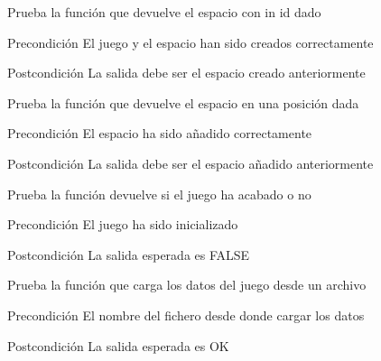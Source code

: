\begin{DoxyRefList}
\item[\label{test__test000086}%
\hypertarget{test__test000086}{}%
Global \hyperlink{game__test_8c_acc05e3dc9b82dbd4566c26a039646df9}{test1\-\_\-game\-\_\-get\-\_\-space} ()]Prueba la función que devuelve el espacio con in id dado \begin{DoxyPrecond}{Precondición}
El juego y el espacio han sido creados correctamente 
\end{DoxyPrecond}
\begin{DoxyPostcond}{Postcondición}
La salida debe ser el espacio creado anteriormente  
\end{DoxyPostcond}

\item[\label{test__test000089}%
\hypertarget{test__test000089}{}%
Global \hyperlink{game__test_8c_a98eac6fd35561009ca78b17022316cef}{test1\-\_\-game\-\_\-get\-\_\-space\-\_\-at} ()]Prueba la función que devuelve el espacio en una posición dada \begin{DoxyPrecond}{Precondición}
El espacio ha sido añadido correctamente 
\end{DoxyPrecond}
\begin{DoxyPostcond}{Postcondición}
La salida debe ser el espacio añadido anteriormente  
\end{DoxyPostcond}

\item[\label{test__test000066}%
\hypertarget{test__test000066}{}%
Global \hyperlink{game__test_8c_a6ab3378c3e627b8ff5cb397ecb46d268}{test1\-\_\-game\-\_\-is\-\_\-over} ()]Prueba la función devuelve si el juego ha acabado o no \begin{DoxyPrecond}{Precondición}
El juego ha sido inicializado 
\end{DoxyPrecond}
\begin{DoxyPostcond}{Postcondición}
La salida esperada es F\-A\-L\-S\-E  
\end{DoxyPostcond}

\item[\label{test__test000056}%
\hypertarget{test__test000056}{}%
Global \hyperlink{game__management__test_8c_ac35aa469cb2dbc5eb072c19fbc6e0970}{test1\-\_\-game\-\_\-management\-\_\-load} ()]Prueba la función que carga los datos del juego desde un archivo \begin{DoxyPrecond}{Precondición}
El nombre del fichero desde donde cargar los datos 
\end{DoxyPrecond}
\begin{DoxyPostcond}{Postcondición}
La salida esperada es O\-K  
\end{DoxyPostcond}


\end{DoxyRefList}
